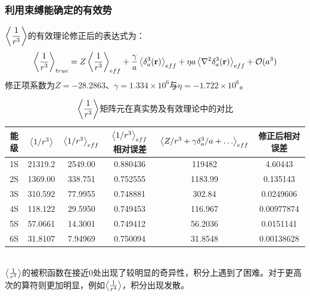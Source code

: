 \documentclass[hyperref,cs4size,titlepage,twoside]{ctexart}
\begin{document}
\subsubsection{利用束缚能确定的有效势}
$\displaystyle\expval{\frac{1}{r^3}}$的有效理论修正后的表达式为：
\begin{equation}\label{r3true}
  \expval{\frac{1}{r^3}}_{true}=Z\expval{\frac{1}{r^3}}_{eff}+\frac{\gamma}{a}\expval{\delta^3_a(\vb{r})}_{eff}+\eta a\expval{\laplacian{\delta^3_a(\vb{r})}}_{eff}+\mathcal{O}(a^3)
\end{equation}
修正项系数为$Z=-28.2863$、$\gamma=1.334\times10^6$与$\eta=-1.722\times10^6$。
\begin{table}[!hbtp]
  \centering
  \begin{tabular}{|cccccc|}
    \hline
    能级 & $\expval{1/r^3}$ & $\expval{1/r^3}_{eff}$ & $\expval{1/r^3}_{eff}$ 相对误差& $\expval{Z/r^3+\gamma \delta^3_a/a+\dots}_{eff}$ & 修正后相对误差 \\
    \hline
    1S & 21319.2 & 2549.00 &0.880436& 119482&4.60443 \\
    2S & 1369.00 & 338.751 &0.752555& 1183.99&0.135143 \\
    3S & 310.592 & 77.9955 &0.748881& 302.84&0.0249606 \\
    4S & 118.122 & 29.5950 &0.749453& 116.967&0.00977874 \\
    5S & 57.0661 & 14.3001 &0.749412& 56.2036&0.0151141 \\
    6S & 31.8107 & 7.94969 &0.750094& 31.8548&0.00138628 \\
    \hline
  \end{tabular}
  \caption{$\displaystyle\expval{\frac{1}{r^3}}$矩阵元在真实势及有效理论中的对比}\label{evr3}
\end{table}\\
$\expval{\frac{1}{r^3}}$的被积函数在接近0处出现了较明显的奇异性，积分上遇到了困难。对于更高次的算符则更加明显，例如$\expval{\frac{1}{r^4}}$，积分出现发散。
\end{document}
